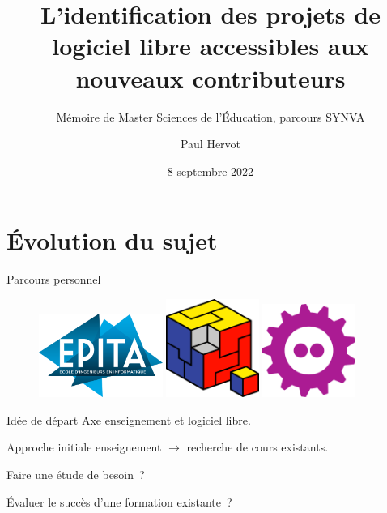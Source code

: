 \documentclass[usenames,dvipsnames,10pt]{beamer}
\title{L'identification des projets de logiciel libre accessibles aux nouveaux contributeurs}
\subtitle{Mémoire de Master Sciences de l'Éducation, parcours SYNVA}
\institute[]{\href{https://creativecommons.org/licenses/by-sa/4.0/}{\ccbysa}}
\author[PH]{Paul Hervot}
\date{8 septembre 2022}
\begin{document}
\frame{\titlepage{}}

\section{Évolution du sujet}

\begin{frame}[fragile]{Parcours personnel}
    \begin{figure}
        \includegraphics[width=0.36\textwidth]{epita}
        \includegraphics[width=0.27\textwidth]{prologin}
        \includegraphics[width=0.27\textwidth]{fosdem}
    \end{figure}

\end{frame}

\begin{frame}[fragile]{Idée de départ}
    Axe enseignement et logiciel libre.

    Approche initiale enseignement $\rightarrow$ recherche de cours existants.

    Faire une étude de besoin ?

    Évaluer le succès d'une formation existante ?
\end{frame}
\end{document}
